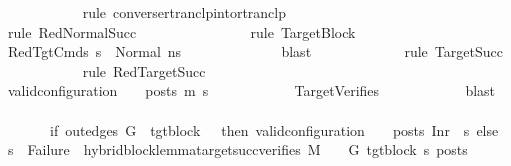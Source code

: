 \begin{isabellebody}
\ \ \ \ \ \ \ \ \ \ \isamarkupfalse%
\ {\isacharparenleft}{\kern0pt}rule\ converse{\isacharunderscore}{\kern0pt}rtranclp{\isacharunderscore}{\kern0pt}into{\isacharunderscore}{\kern0pt}rtranclp{\isacharparenright}{\kern0pt}\isanewline
\ \ \ \ \ \ \ \ \ \ \ \isamarkupfalse%
\ {\isacharparenleft}{\kern0pt}rule\ RedNormalSucc{\isacharparenright}{\kern0pt}\ \isanewline
\ \ \ \ \ \ \ \ \ \ \ \ \ \isamarkupfalse%
\ {\isacharparenleft}{\kern0pt}rule\ TargetBlock{\isacharparenright}{\kern0pt}\isanewline
\ \ \ \ \ \ \ \ \ \ \isamarkupfalse%
\ RedTgtCmds\ {\isacartoucheopen}s{}{\isacharprime}{\kern0pt}\ {\isacharequal}{\kern0pt}\ Normal\ ns{}{\isacharprime}{\kern0pt}{\isacartoucheclose}\isanewline
\ \ \ \ \ \ \ \ \ \ \ \ \isamarkupfalse%
\ blast\isanewline
\ \ \ \ \ \ \ \ \ \ \ \isamarkupfalse%
\ {\isacharparenleft}{\kern0pt}rule\ TargetSucc{\isacharparenright}{\kern0pt}\isanewline
\ \ \ \ \ \ \ \ \ \ \isamarkupfalse%
\ {\isacharparenleft}{\kern0pt}rule\ RedTargetSucc{\isacharparenright}{\kern0pt}\isanewline
\ \ \ \ \ \ \ \ \ \ \isamarkupfalse%
\isanewline
\isanewline
\ \ \ \ \ \ \ \ \isamarkupfalse%
\ {\isachardoublequoteopen}valid{\isacharunderscore}{\kern0pt}configuration\ {\isasymLambda}\ {\isasymGamma}\ {\isasymOmega}\ posts\ m{}{\isacharprime}{\kern0pt}\ s{}{\isacharprime}{\kern0pt}{\isachardoublequoteclose}\isanewline
\ \ \ \ \ \ \ \ \ \ \isamarkupfalse%
\ TargetVerifies\isanewline
\ \ \ \ \ \ \ \ \ \ \isamarkupfalse%
\ blast\isanewline
\ \ \ \ \ \ \isamarkupfalse%
\isanewline
\isanewline
\ \ \ \ \ \ \isamarkupfalse%
\ \isamarkupfalse%
\ \isanewline
\ \ \ \ \ \ \ {\isachardoublequoteopen}{\isacharparenleft}{\kern0pt}if\ out{\isacharunderscore}{\kern0pt}edges\ G{\isacharprime}{\kern0pt}\ {\isacharbang}{\kern0pt}\ tgt{\isacharunderscore}{\kern0pt}block\ {\isacharequal}{\kern0pt}\ {\isacharbrackleft}{\kern0pt}{\isacharbrackright}{\kern0pt}\ then\ valid{\isacharunderscore}{\kern0pt}configuration\ {\isasymLambda}\ {\isasymGamma}\ {\isasymOmega}\ posts\ {\isacharparenleft}{\kern0pt}Inr\ {\isacharparenleft}{\kern0pt}{\isacharparenright}{\kern0pt}{\isacharparenright}{\kern0pt}\ s{}{\isacharprime}{\kern0pt}\ else\ s{}{\isacharprime}{\kern0pt}\ {\isasymnoteq}\ Failure{\isacharparenright}{\kern0pt}\ {\isasymand}\ hybrid{\isacharunderscore}{\kern0pt}block{\isacharunderscore}{\kern0pt}lemma{\isacharunderscore}{\kern0pt}target{\isacharunderscore}{\kern0pt}succ{\isacharunderscore}{\kern0pt}verifies\ M\ {\isasymLambda}\ {\isasymGamma}\ {\isasymOmega}\ G{\isacharprime}{\kern0pt}\ tgt{\isacharunderscore}{\kern0pt}block\ s{}{\isacharprime}{\kern0pt}\ posts{\isachardoublequoteclose}\isanewline

\end{isabellebody}

